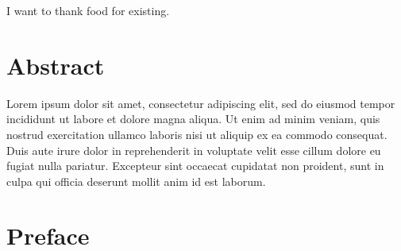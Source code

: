 \documentclass[a4paper,11pt]{article}
\begin{document}
I want to thank food for existing.
\pagestyle{plain}
\setcounter{page}{1}    %

\newpage
\hypertarget{abstract}{%
\section*{Abstract}\label{abstract}}

Lorem ipsum dolor sit amet, consectetur adipiscing elit, sed do eiusmod tempor incididunt ut labore et dolore magna aliqua. Ut enim ad minim veniam, quis nostrud exercitation ullamco laboris nisi ut aliquip ex ea commodo consequat. Duis aute irure dolor in reprehenderit in voluptate velit esse cillum dolore eu fugiat nulla pariatur. Excepteur sint occaecat cupidatat non proident, sunt in culpa qui officia deserunt mollit anim id est laborum.

\newpage
\tableofcontents
\clearpage


\newpage
\listoffigures
{}

\newpage
\listoftables
{}

\newpage
\pagestyle{plain}       
\setcounter{page}{1}    %

\hypertarget{preface}{%
\section*{Preface}\label{preface}}
\end{document}

